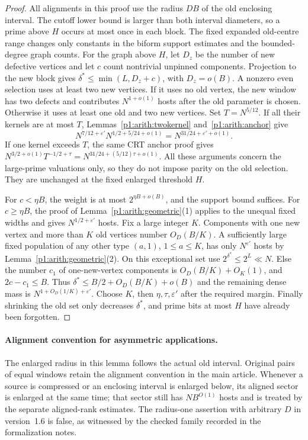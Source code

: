 \begin{proof}
All alignments in this proof use the radius $DB$ of the old enclosing
interval.  The cutoff lower bound is larger than both interval diameters,
so a prime above $H$ occurs at most once in each block.
The fixed expanded old-centre range changes only constants in the
biform support estimates and the bounded-degree graph counts.
For the graph above $H$, let $D_z$ be the number of new defective vertices
and let $c$ count nontrivial unpinned components.  Projection to the new
block gives $\delta^*\leq\min(L,D_z+c)$, with $D_z=o(B)$.
A nonzero even selection uses at least two new vertices.  If it uses no
old vertex, the new window has two defects and contributes $N^{1+o(1)}$
hosts after the old parameter is chosen.  Otherwise it uses at least one
old and two new vertices.  Set $T=N^{5/12}$.
If all their kernels are at most $T$, Lemmas~\ref{p1:arith:twokernel}
and~\ref{p1:arith:anchor} give
\[
 N^{7/12+\varepsilon'}N^{1/2+5/24+o(1)}=N^{31/24+\varepsilon'+o(1)}.
\]
If one kernel exceeds $T$, the same CRT anchor proof gives
$N^{3/2+o(1)}T^{-1/2+\tau}=N^{31/24+(5/12)\tau+o(1)}$.
All these arguments concern the large-prime valuations only, so they do
not impose parity on the old selection.  They are unchanged at the
fixed enlarged threshold $H$.

For $c<\eta B$, the weight is at most $2^{\eta B+o(B)}$, and the support
bound suffices.  For $c\geq\eta B$, the proof of
Lemma~\ref{p1:arith:geometric}(1) applies to the unequal fixed widths and
gives $N^{1/2+\varepsilon'}$ hosts.  Fix a large integer $K$.  Components
with one new vertex and more than $K$ old vertices number $O_D(B/K)$.
A sufficiently large fixed population of any other type $(a,1)$,
$1\leq a\leq K$, has only $N^{\varepsilon'}$ hosts by
Lemma~\ref{p1:arith:geometric}(2).  On this exceptional set use
$2^{\delta^*}\leq2^L\ll N$.  Else the number $c_1$ of one-new-vertex
components is $O_D(B/K)+O_K(1)$, and $2c-c_1\leq B$.  Thus
$\delta^*\leq B/2+O_D(B/K)+o(B)$ and the remaining dense mass is
$N^{1+O_D(1/K)+\varepsilon'}$.
Choose $K$, then $\eta,\tau,\varepsilon'$ after the required margin.
Finally shrinking the old set only decreases $\delta^*$, and prime bits
at most $H$ have already been forgotten.
\end{proof}

\paragraph{Alignment convention for asymmetric applications.}
The enlarged radius in this lemma follows the actual old interval.
Original pairs of equal windows retain the alignment convention in
the main article.  Whenever a source is compressed or an enclosing
interval is enlarged below, its aligned sector is enlarged at the
same time; that sector still has $NB^{O(1)}$ hosts and is treated by
the separate aligned-rank estimates.  The radius-one assertion with
arbitrary $D$ in version~1.6 is false, as witnessed by the checked
family recorded in the formalization notes.


